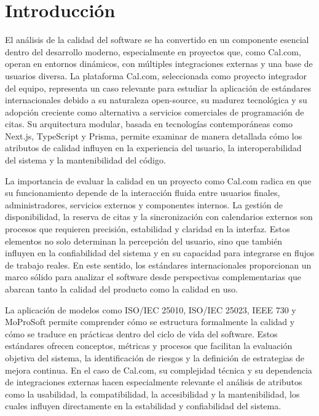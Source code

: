 \documentclass{article}
\begin{document}
\newpage
\section{Introducción}
El análisis de la calidad del software se ha convertido en un componente esencial dentro del desarrollo moderno, especialmente en proyectos que, como Cal.com, operan en entornos dinámicos, con múltiples integraciones externas y una base de usuarios diversa. La plataforma Cal.com, seleccionada como proyecto integrador del equipo, representa un caso relevante para estudiar la aplicación de estándares internacionales debido a su naturaleza open-source, su madurez tecnológica y su adopción creciente como alternativa a servicios comerciales de programación de citas. Su arquitectura modular, basada en tecnologías contemporáneas como Next.js, TypeScript y Prisma, permite examinar de manera detallada cómo los atributos de calidad influyen en la experiencia del usuario, la interoperabilidad del sistema y la mantenibilidad del código.

La importancia de evaluar la calidad en un proyecto como Cal.com radica en que su funcionamiento depende de la interacción fluida entre usuarios finales, administradores, servicios externos y componentes internos. La gestión de disponibilidad, la reserva de citas y la sincronización con calendarios externos son procesos que requieren precisión, estabilidad y claridad en la interfaz. Estos elementos no solo determinan la percepción del usuario, sino que también influyen en la confiabilidad del sistema y en su capacidad para integrarse en flujos de trabajo reales. En este sentido, los estándares internacionales proporcionan un marco sólido para analizar el software desde perspectivas complementarias que abarcan tanto la calidad del producto como la calidad en uso.

La aplicación de modelos como ISO/IEC 25010, ISO/IEC 25023, IEEE 730 y MoProSoft permite comprender cómo se estructura formalmente la calidad y cómo se traduce en prácticas dentro del ciclo de vida del software. Estos estándares ofrecen conceptos, métricas y procesos que facilitan la evaluación objetiva del sistema, la identificación de riesgos y la definición de estrategias de mejora continua. En el caso de Cal.com, su complejidad técnica y su dependencia de integraciones externas hacen especialmente relevante el análisis de atributos como la usabilidad, la compatibilidad, la accesibilidad y la mantenibilidad, los cuales influyen directamente en la estabilidad y confiabilidad del sistema.
\end{document}
